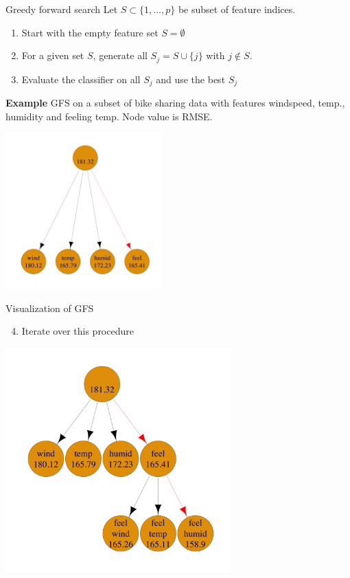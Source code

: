 \documentclass[11pt,compress,t,notes=noshow, xcolor=table]{beamer}
\begin{document}
\begin{frame}{Greedy forward search}
Let $S \subset \{1, \dots, p \}$ be subset of feature indices.
\vspace{-0.01cm}
    \begin{enumerate}
      \item Start with the empty feature set $S = \emptyset$
      \item For a given set $S$, generate all $S_j = S \cup \{j\}$ with $j \notin S$.
      \item Evaluate the classifier on all $S_j$ and use the best $S_j$
      \end{enumerate}
    \textbf{Example} GFS on a subset of bike sharing data with features windspeed, temp., humidity and feeling temp. Node value is RMSE.
    \begin{center}
    \includegraphics[width = 0.45\textwidth]{figure/fs-wrappers-powerset-tree-1.png}
    \end{center}

\end{frame}

\begin{frame}[noframenumbering]{Visualization of GFS}
\begin{enumerate}
    \setcounter{enumi}{3}
    \item Iterate over this procedure
\end{enumerate}
    \begin{center}
      \includegraphics[width = 0.65\textwidth]{figure/fs-wrappers-powerset-tree-2.png}
      \end{center}
\end{frame}
\end{document}
